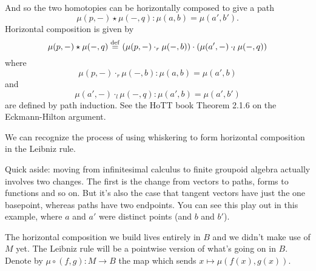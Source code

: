 \begin{center}
\end{center}

And so the two homotopies can be horizontally composed to give a path \[ \mu(p,-)\star\mu(-,q): \mu(a, b)=\mu(a',b'). \] Horizontal composition is given by \[\mu(p,-)\star\mu(-,q)\stackrel{\mathrm{def}}{=}(\mu(p,-)\cdot_r \mu(-,b))\cdot(\mu(a', -)\cdot_l\mu(-, q))\] where \[ \mu(p,-)\cdot_r\mu(-,b):\mu(a,b)=\mu(a',b) \] and \[ \mu(a',-)\cdot_l\mu(-,q):\mu(a',b)=\mu(a',b') \] are defined by path induction.  See the HoTT book Theorem 2.1.6 on the Eckmann-Hilton argument\cite{hottbook}.

We can recognize the process of using whiskering to form horizontal composition in the Leibniz rule. 

Quick aside: moving from infinitesimal calculus to finite groupoid algebra actually involves two changes. The first is the change from vectors to paths, forms to functions and so on. But it's also the case that tangent vectors have just the one basepoint, whereas paths have two endpoints. You can see this play out in this example, where \( a \) and \( a' \) were distinct points (and \( b \) and \( b' \)).

The horizontal composition we build lives entirely in \( B \) and we didn't make use of \( M \) yet. The Leibniz rule will be a pointwise version of what's going on in \( B \). Denote by \( \mu\circ(f,g):M\to B \) the map which sends \( x\mapsto \mu(f(x),g(x)) \).

